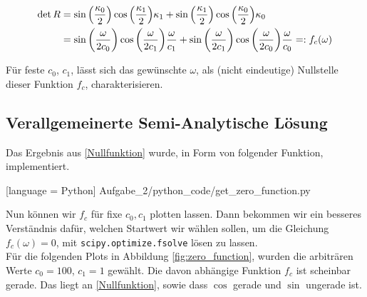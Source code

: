 \begin{align} \label{Nullfunktion}
  \nonumber
  \det{R}
  & = \sin{\left(\frac{{\kappa}_{0}}{2} \right)} \cos{\left(\frac{{\kappa}_{1}}{2} \right)} {\kappa}_{1} + \sin{\left(\frac{{\kappa}_{1}}{2} \right)} \cos{\left(\frac{{\kappa}_{0}}{2} \right)} {\kappa}_{0} \\
  & = \sin{{\left ( \frac{\omega}{2 c_0} \right )}}
      \cos{{\left ( \frac{\omega}{2 c_1} \right )}}
      \frac{\omega}{c_1} +
      \sin{{\left ( \frac{\omega}{2 c_1} \right )}}
      \cos{{\left ( \frac{\omega}{2 c_0} \right )}}
      \frac{\omega}{c_0} =: f_c(\omega)
\end{align}

Für feste $c_0$, $c_1$, lässt sich das gewünschte $\omega$, als (nicht eindeutige) Nullstelle dieser Funktion $f_c$, charakterisieren.

\subsection{Verallgemeinerte Semi-Analytische Lösung}

Das Ergebnis aus \eqref{Nullfunktion} wurde, in Form von folgender Funktion, implementiert.


[language = Python]
{Aufgabe_2/python_code/get_zero_function.py}

Nun können wir $f_c$ für fixe $c_0, c_1$ plotten lassen. Dann bekommen wir ein besseres Verständnis dafür, welchen Startwert wir wählen sollen, um die Gleichung $f_c(\omega) = 0$, mit \verb|scipy.optimize.fsolve| lösen zu lassen. \\

Für die folgenden Plots in Abbildung \ref{fig:zero_function}, wurden die arbiträren Werte $c_0 = 100$, $c_1 = 1$ gewählt. Die davon abhängige Funktion $f_c$ ist scheinbar gerade. Das liegt an \eqref{Nullfunktion}, sowie dass $\cos$ gerade und $\sin$ ungerade ist.

